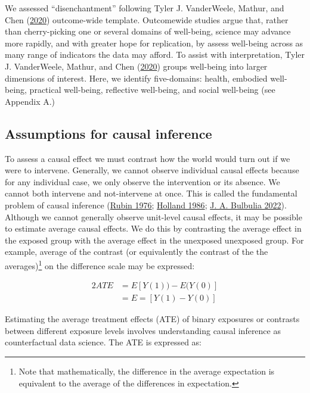 \documentclass[
  singlecolumn]{report}
\begin{document}
We assessed ``disenchantment'' following Tyler J. VanderWeele, Mathur,
and Chen (\protect\hyperlink{ref-vanderweele2020}{2020}) outcome-wide
template. Outcomewide studies argue that, rather than cherry-picking one
or several domains of well-being, science may advance more rapidly, and
with greater hope for replication, by assess well-being across as many
range of indicators the data may afford. To assist with interpretation,
Tyler J. VanderWeele, Mathur, and Chen
(\protect\hyperlink{ref-vanderweele2020}{2020}) groups well-being into
larger dimensions of interest. Here, we identify five-domains: health,
embodied well-being, practical well-being, reflective well-being, and
social well-being (see Appendix A.)

\hypertarget{assumptions-for-causal-inference}{%
\subsection{Assumptions for causal
inference}\label{assumptions-for-causal-inference}}

To assess a causal effect we must contrast how the world would turn out
if we were to intervene. Generally, we cannot observe individual causal
effects because for any individual case, we only observe the
intervention or its absence. We cannot both intervene and not-intervene
at once. This is called the fundamental problem of causal inference
(\protect\hyperlink{ref-rubin1976}{Rubin 1976};
\protect\hyperlink{ref-holland1986}{Holland 1986};
\protect\hyperlink{ref-bulbulia2022}{J. A. Bulbulia 2022}). Although we
cannot generally observe unit-level causal effects, it may be possible
to estimate average causal effects. We do this by contrasting the
average effect in the exposed group with the average effect in the
unexposed unexposed group. For example, average of the contrast (or
equivalently the contrast of the the averages)\footnote{Note that
  mathematically, the difference in the average expectation is
  equivalent to the average of the differences in expectation.} on the
difference scale may be expressed:

\begin{alignat*}{2}
ATE & = E[Y(1)) - E(Y(0)]\\
& = E=[Y(1) - Y(0)]
\end{alignat*}

Estimating the average treatment effects (ATE) of binary exposures or
contrasts between different exposure levels involves understanding
causal inference as counterfactual data science. The ATE is expressed
as:
\end{document}
